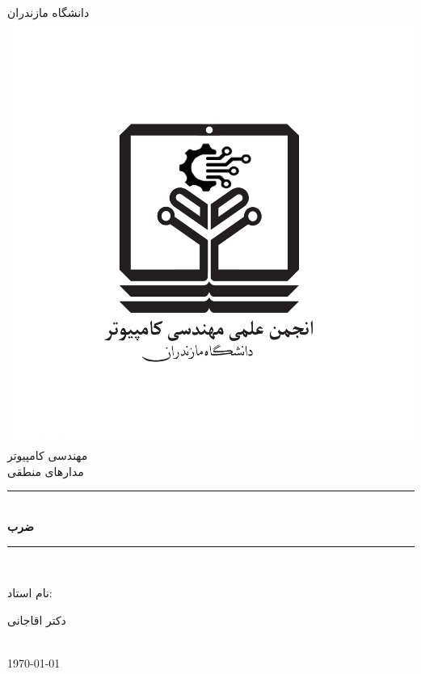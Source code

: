 \begin{titlepage}

\newcommand{\HRule}{\rule{\linewidth}{0.5mm}}

\center

\textsc{\LARGE دانشگاه مازندران}\\
\includegraphics[scale=.2]{figure/logo.png}\\[1cm]
\textsc{\Large مهندسی کامپیوتر}\\[0.5cm]
\textsc{\large مدارهای منطقی}\\[0.5cm]

\HRule \\[0.4cm]
{ \huge \bfseries ضرب}\\[0.4cm]
\HRule \\[1.5cm]

\begin{minipage}{0.4\textwidth}
\begin{flushright} \large
نام استاد:\\
\end{flushright}
\begin{center} \large
دکتر اقاجانی
\end{center}
\end{minipage}\\[2cm]

{\large \today}\\[2cm]

\end{titlepage}
\newpage